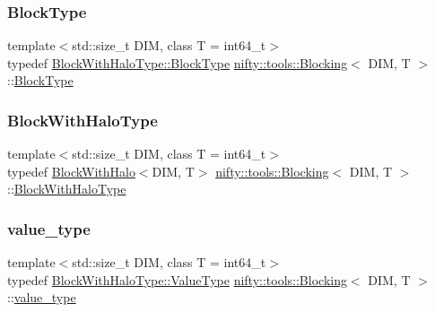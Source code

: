 \subsubsection{\texorpdfstring{Block\+Type}{BlockType}}
{\footnotesize\ttfamily template$<$std\+::size\+\_\+t D\+IM, class T  = int64\+\_\+t$>$ \\
typedef \hyperlink{classnifty_1_1tools_1_1BlockWithHalo_a98d2c04518f8902ab6d985feba605987}{Block\+With\+Halo\+Type\+::\+Block\+Type} \hyperlink{classnifty_1_1tools_1_1Blocking}{nifty\+::tools\+::\+Blocking}$<$ D\+IM, T $>$\+::\hyperlink{classnifty_1_1tools_1_1Blocking_a597e0d4186d2d40ccb96698cc16775c6}{Block\+Type}}

\mbox{\label{classnifty_1_1tools_1_1Blocking_abebd9361d89cc399bc495861fa4e331d}} 
\subsubsection{\texorpdfstring{Block\+With\+Halo\+Type}{BlockWithHaloType}}
{\footnotesize\ttfamily template$<$std\+::size\+\_\+t D\+IM, class T  = int64\+\_\+t$>$ \\
typedef \hyperlink{classnifty_1_1tools_1_1BlockWithHalo}{Block\+With\+Halo}$<$D\+IM, T$>$ \hyperlink{classnifty_1_1tools_1_1Blocking}{nifty\+::tools\+::\+Blocking}$<$ D\+IM, T $>$\+::\hyperlink{classnifty_1_1tools_1_1Blocking_abebd9361d89cc399bc495861fa4e331d}{Block\+With\+Halo\+Type}}

\mbox{\label{classnifty_1_1tools_1_1Blocking_a4ea21e967d25e621a000176dc994c85e}} 
\subsubsection{\texorpdfstring{value\+\_\+type}{value\_type}}
{\footnotesize\ttfamily template$<$std\+::size\+\_\+t D\+IM, class T  = int64\+\_\+t$>$ \\
typedef \hyperlink{classnifty_1_1tools_1_1BlockWithHalo_a65d120db84dfca7586ae5ab30f26f01b}{Block\+With\+Halo\+Type\+::\+Value\+Type} \hyperlink{classnifty_1_1tools_1_1Blocking}{nifty\+::tools\+::\+Blocking}$<$ D\+IM, T $>$\+::\hyperlink{classnifty_1_1tools_1_1Blocking_a4ea21e967d25e621a000176dc994c85e}{value\+\_\+type}}

